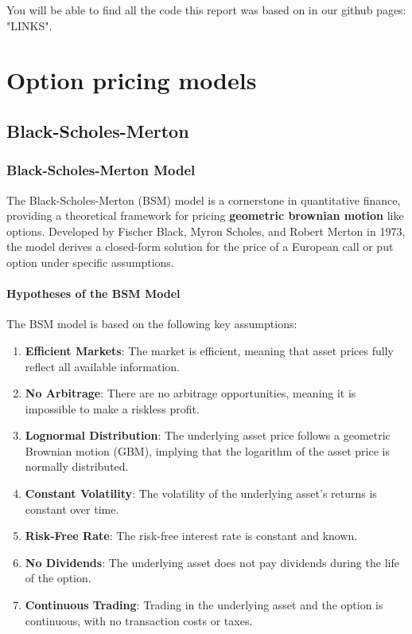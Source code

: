 \documentclass[11pt, oneside, a4paper, titlepage]{report}
\begin{document}
You will be able to find all the code this report was based on in our github pages: "LINKS".

\chapter{Option pricing models}

\section{Black-Scholes-Merton}

\subsection{Black-Scholes-Merton Model}

The Black-Scholes-Merton (BSM) model is a cornerstone in quantitative finance, providing a theoretical framework for pricing \textbf{geometric brownian motion} like options. Developed by Fischer Black, Myron Scholes, and Robert Merton in 1973, the model derives a closed-form solution for the price of a European call or put option under specific assumptions.

\subsubsection{Hypotheses of the BSM Model}

The BSM model is based on the following key assumptions:

\begin{enumerate}
    \item \textbf{Efficient Markets}: The market is efficient, meaning that asset prices fully reflect all available information.
    \item \textbf{No Arbitrage}: There are no arbitrage opportunities, meaning it is impossible to make a riskless profit.
    \item \textbf{Lognormal Distribution}: The underlying asset price follows a geometric Brownian motion (GBM), implying that the logarithm of the asset price is normally distributed.
    \item \textbf{Constant Volatility}: The volatility of the underlying asset's returns is constant over time.
    \item \textbf{Risk-Free Rate}: The risk-free interest rate is constant and known.
    \item \textbf{No Dividends}: The underlying asset does not pay dividends during the life of the option.
    \item \textbf{Continuous Trading}: Trading in the underlying asset and the option is continuous, with no transaction costs or taxes.
\end{enumerate}
\end{document}
